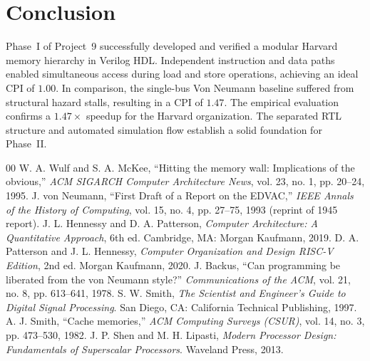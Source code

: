 \documentclass[conference]{IEEEtran}
\begin{document}
\section{Conclusion}
Phase~I of Project~9 successfully developed and verified a modular Harvard memory hierarchy in Verilog HDL. Independent instruction and data paths enabled simultaneous access during load and store operations, achieving an ideal CPI of $1.00$. In comparison, the single-bus Von Neumann baseline suffered from structural hazard stalls, resulting in a CPI of $1.47$. The empirical evaluation confirms a $1.47\times$ speedup for the Harvard organization. The separated RTL structure and automated simulation flow establish a solid foundation for Phase~II.

\begin{thebibliography}{00}
 W. A. Wulf and S. A. McKee, ``Hitting the memory wall: Implications of the obvious,'' \textit{ACM SIGARCH Computer Architecture News}, vol. 23, no. 1, pp. 20--24, 1995.
 J. von Neumann, ``First Draft of a Report on the EDVAC,'' \textit{IEEE Annals of the History of Computing}, vol. 15, no. 4, pp. 27--75, 1993 (reprint of 1945 report).
 J. L. Hennessy and D. A. Patterson, \textit{Computer Architecture: A Quantitative Approach}, 6th ed. Cambridge, MA: Morgan Kaufmann, 2019.
 D. A. Patterson and J. L. Hennessy, \textit{Computer Organization and Design RISC-V Edition}, 2nd ed. Morgan Kaufmann, 2020.
 J. Backus, ``Can programming be liberated from the von Neumann style?'' \textit{Communications of the ACM}, vol. 21, no. 8, pp. 613--641, 1978.
 S. W. Smith, \textit{The Scientist and Engineer's Guide to Digital Signal Processing}. San Diego, CA: California Technical Publishing, 1997.
 A. J. Smith, ``Cache memories,'' \textit{ACM Computing Surveys (CSUR)}, vol. 14, no. 3, pp. 473--530, 1982.
 J. P. Shen and M. H. Lipasti, \textit{Modern Processor Design: Fundamentals of Superscalar Processors}. Waveland Press, 2013.
\end{thebibliography}
\end{document}
